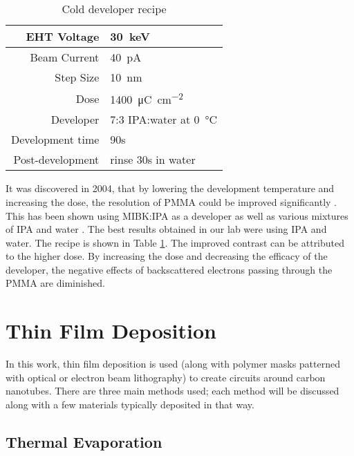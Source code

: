 \begin{table}
	\centering
	\caption{Cold developer recipe}
    \begin{tabular}{ r | l }
    	\hline
    	EHT Voltage & \SI{30}{\kilo\electronvolt} \\ \hline
    	Beam Current & \SI{40}{\pico\ampere} \\ \hline
    	Step Size & \SI{10}{\nano\meter} \\ \hline
    	Dose & \SI{1400}{\micro\coulomb\per\square\centi\meter} \\ \hline
    	Developer & 7:3 IPA:water at \SI{0}{\degreeCelsius} \\ \hline
    	Development time & 90s \\ \hline
    	Post-development & rinse 30s in water \\ \hline
    \end{tabular}
    \label{table:cold_pmma}
\end{table}

It was discovered in 2004, that by lowering the development temperature and increasing the dose, the resolution of PMMA could be improved significantly \cite{Hu2004}. This has been shown using MIBK:IPA as a developer as well as various mixtures of IPA and water \cite{Cord2007, Yasin2002, Rooks2002, Koshelev2011}. The best results obtained in our lab were using IPA and water. The recipe is shown in Table \ref{table:cold_pmma}. The improved contrast can be attributed to the higher dose. By increasing the dose and decreasing the efficacy of the developer, the negative effects of backscattered electrons passing through the PMMA are diminished.

\section{Thin Film Deposition}
\label{sec:thin_film}

In this work, thin film deposition is used (along with polymer masks patterned with optical or electron beam lithography) to create circuits around carbon nanotubes. There are three main methods used; each method will be discussed along with a few materials typically deposited in that way. 

\subsection{Thermal Evaporation}
\label{subsec:thermal_evap}

